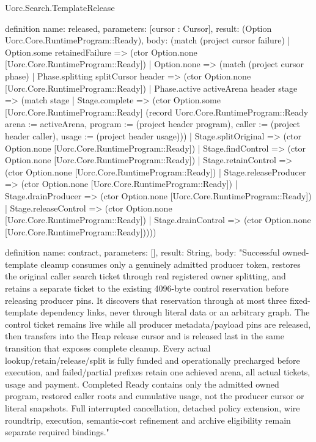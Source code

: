 \begin{lexlean}{Uorc.Search.TemplateRelease}
\begin{semanticmodule}
definition{
  name: released,
  parameters: [cursor : Cursor],
  result: (Option Uorc.Core.RuntimeProgram::Ready),
  body: (match (project cursor failure)
    | Option.some retainedFailure => (ctor Option.none [Uorc.Core.RuntimeProgram::Ready])
    | Option.none => (match (project cursor phase)
      | Phase.splitting splitCursor header => (ctor Option.none [Uorc.Core.RuntimeProgram::Ready])
      | Phase.active activeArena header stage => (match stage
        | Stage.complete => (ctor Option.some [Uorc.Core.RuntimeProgram::Ready] (record Uorc.Core.RuntimeProgram::Ready {arena := activeArena, program := (project header program), caller := (project header caller), usage := (project header usage)}))
        | Stage.splitOriginal => (ctor Option.none [Uorc.Core.RuntimeProgram::Ready])
        | Stage.findControl => (ctor Option.none [Uorc.Core.RuntimeProgram::Ready])
        | Stage.retainControl => (ctor Option.none [Uorc.Core.RuntimeProgram::Ready])
        | Stage.releaseProducer => (ctor Option.none [Uorc.Core.RuntimeProgram::Ready])
        | Stage.drainProducer => (ctor Option.none [Uorc.Core.RuntimeProgram::Ready])
        | Stage.releaseControl => (ctor Option.none [Uorc.Core.RuntimeProgram::Ready])
        | Stage.drainControl => (ctor Option.none [Uorc.Core.RuntimeProgram::Ready]))))
}

definition{
  name: contract,
  parameters: [],
  result: String,
  body: "Successful owned-template cleanup consumes only a genuinely admitted producer token, restores the original caller search ticket through real registered owner splitting, and retains a separate ticket to the existing 4096-byte control reservation before releasing producer pins. It discovers that reservation through at most three fixed-template dependency links, never through literal data or an arbitrary graph. The control ticket remains live while all producer metadata/payload pins are released, then transfers into the Heap release cursor and is released last in the same transition that exposes complete cleanup. Every actual lookup/retain/release/split is fully funded and operationally precharged before execution, and failed/partial prefixes retain one achieved arena, all actual tickets, usage and payment. Completed Ready contains only the admitted owned program, restored caller roots and cumulative usage, not the producer cursor or literal snapshots. Full interrupted cancellation, detached policy extension, wire roundtrip, execution, semantic-cost refinement and archive eligibility remain separate required bindings."
}
\end{semanticmodule}
\end{lexlean}
